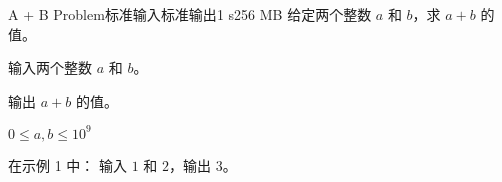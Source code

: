 \begin{problem}{A + B Problem}{标准输入}{标准输出}{1 s}{256 MB}
    给定两个整数 $a$ 和 $b$，求 $a + b$ 的值。

    \InputFile
    输入两个整数 $a$ 和 $b$。

    \OutputFile
    输出 $a + b$ 的值。

    \Example

    \begin{example}
    \end{example}

    \Constraints
    $0 \leq a, b \leq 10^9$

    \Explanations
    在示例 1 中：
    输入 $1$ 和 $2$，输出 $3$。
\end{problem}